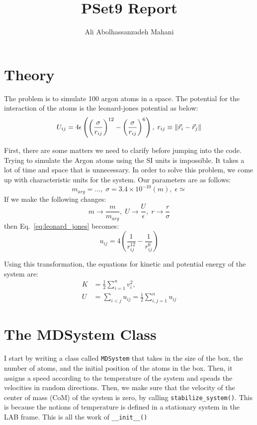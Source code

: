 \documentclass[12pt, a4paper]{article}
\title{PSet9 Report}
\author{Ali Abolhassanzadeh Mahani}
\begin{document}
	\maketitle
	\section{Theory}
	The problem is to simulate 100 argon atoms in a space. The potential for the interaction of 
	the atoms is the leonard-jones potential as below:
	\begin{equation}
		U_{ij} = 4\epsilon \left(\left(\frac{\sigma}{r_{ij}}\right)^{12} - 
		\left(\frac{\sigma}{r_{ij}}\right)^6\right), \; 
		r_{ij} \equiv \norm{\vec{r}_i - \vec{r}_j}
		\label{eq:leonard_jones}
	\end{equation}

	First, there are some matters we need to clarify before jumping into the code.
	Trying to simulate the Argon atoms using the SI units is impossible. It takes a lot of time and
	space that is unnecessary. In order to solve this problem, we come up with characteristic 
	units for the system. Our parameters are as follows:
	\begin{equation}
		m_{arg} = \dots, \; \sigma = 3.4 \times 10^{-10} (m), \; \epsilon \simeq 
	\end{equation}
	If we make the following changes:
	\begin{equation}
		m \rightarrow \frac{m}{m_{arg}}, \; U \rightarrow \frac{U}{\epsilon}, \; r \rightarrow 
		\frac{r}{\sigma}
	\end{equation}
	then Eq.~\ref{eq:leonard_jones} becomes:
	\begin{equation}
		u_{ij} = 4 \left(\frac{1}{r_{ij}^{12}} - \frac{1}{r_{ij}^6}\right)
	\end{equation}
	
	Using this transformation, the equations for kinetic and potential energy of the system 
	are:
	\begin{equation}
		\begin{aligned}
			K &= \frac{1}{2}\sum_{i=1}^{n} v_i^2,\\
			U &= \sum_{i < j} u_{ij} = \frac{1}{2} \sum_{i, j = 1}^{n} u_{ij}
		\end{aligned}
	\end{equation}

	\section{The MDSystem Class}
	I start by writing a class called \texttt{MDSystem} that takes in the size of the box, the
	number of atoms, and the initial position of the atoms in the box. Then, it assigns a speed 
	according to the temperature of the system and speads the velocities in random directions.
	Then, we make sure that the velocity of the center of mass (CoM)  of the system is zero,
	by calling \texttt{stabilize\_system()}. This is because the notions of temperature is defined 
	in a stationary system in the LAB frame. This is all the work of \texttt{\_\_init\_\_()}
	
\end{document}
